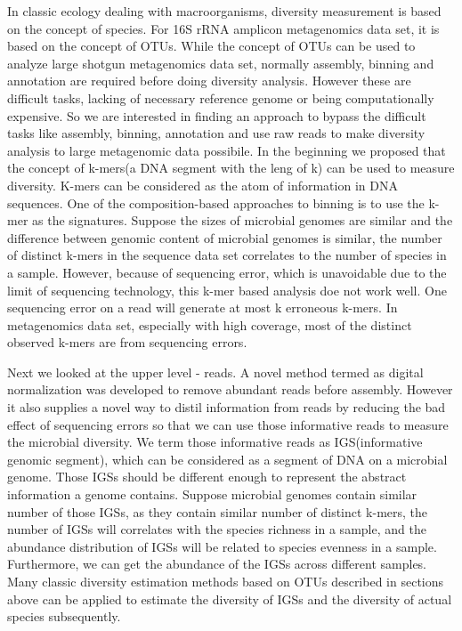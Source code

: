 In classic ecology dealing with macroorganisms, diversity measurement is based 
on the concept of species. For 16S rRNA amplicon metagenomics data set, it is 
based on the concept of OTUs. While the concept of OTUs can be used to analyze
large shotgun metagenomics data set, normally assembly, binning and annotation
are required before doing diversity analysis. However these are difficult
tasks, lacking of necessary reference genome or being computationally
expensive. So we are interested in finding an approach to bypass the difficult
tasks like assembly, binning, annotation and use raw reads to make diversity
analysis to large metagenomic data possibile. In the beginning we proposed that
 the concept of k-mers(a DNA segment with the leng of k) can be used to measure
 diversity. K-mers can be considered as the atom of information in DNA 
sequences. One of the composition-based approaches to binning is to use the 
k-mer as the signatures. Suppose the sizes of microbial genomes are similar and
 the difference between genomic content of microbial genomes is similar, the 
number of distinct k-mers in the sequence data set correlates to the number of 
species in a sample. However, because of sequencing error, which is unavoidable
 due to the limit of sequencing technology, this k-mer based analysis doe not 
work well. One sequencing error on a read will generate at most k erroneous 
k-mers. In metagenomics data set, especially with high coverage, most of the 
distinct observed k-mers are from sequencing errors.

Next we looked at the upper level - reads. A novel method termed as digital 
normalization was developed to remove abundant reads before assembly. However 
it also supplies a novel way to distil information from reads by reducing the
 bad effect of sequencing errors so that we can use those informative reads to 
measure the microbial diversity. We term those informative reads as 
IGS(informative genomic segment), which can be considered as a segment of DNA 
on a microbial genome. Those IGSs should be different enough to represent the 
abstract information a genome contains. Suppose microbial genomes contain 
similar number of those IGSs, as they contain similar number of distinct 
k-mers, the number of IGSs will correlates with the species richness in a 
sample, and the abundance distribution of IGSs will be related to species 
evenness in a sample. Furthermore, we can get the abundance of the IGSs across
different samples. Many classic diversity estimation methods based on OTUs 
 described in sections above can be applied to estimate the diversity of IGSs 
and the diversity of actual species subsequently.

